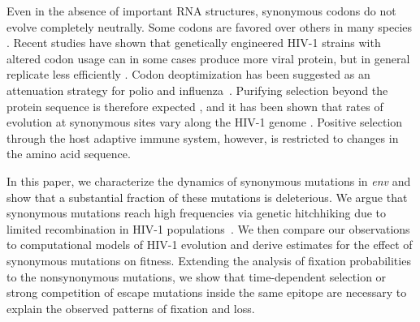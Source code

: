 \documentclass[rmp, twocolumn]{revtex4}
\newcommand{\env}{\textit{env}}
\begin{document}
Even in the absence of important RNA structures, synonymous codons do not evolve
completely neutrally. Some codons are favored over others in many species
\citep{plotkin_synonymous_2011}. Recent studies have shown that genetically
engineered HIV-1 strains with altered codon usage can in some cases produce more
viral protein, but in general replicate less efficiently
\citep{ngumbela_quantitative_2008, li_codon-usage-based_2012,
keating_rich_2009}. Codon deoptimization has been suggested as an attenuation
strategy for polio and influenza~\citep{mueller_live_2010,coleman_virus_2008}.
Purifying selection beyond the protein sequence is therefore expected
\citep{forsdyke_reciprocal_1995,snoeck_mapping_2011}, and it has been shown that
rates of evolution at synonymous sites vary along the HIV-1 genome
\citep{mayrose_towards_2007}. Positive selection through the host adaptive
immune system, however, is restricted to changes in the amino acid sequence.

In this paper, we characterize the dynamics of synonymous mutations in \env{}
and show that a substantial fraction of these mutations is deleterious.  We
argue that synonymous mutations reach high frequencies via genetic hitchhiking
due to limited recombination in HIV-1 populations~\citep{neher_recombination_2010,
batorsky_estimate_2011}. We then compare our observations to computational
models of HIV-1 evolution and derive estimates for the effect of synonymous mutations
 on fitness.  Extending the analysis of fixation probabilities to the
nonsynonymous mutations, we show that time-dependent selection or strong
competition of escape mutations inside the same epitope are necessary to explain
the observed patterns of fixation and loss.

\end{document}
